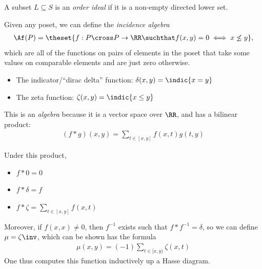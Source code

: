 \begin{definition}

A subset \(L \subseteq S\) is an \emph{order ideal} if it is a non-empty
directed lower set.

\end{definition}

\begin{definition}

Given any poset, we can define the \emph{incidence algebra}
\begin{align*}
\Af(P) = \theset{f: P \cross P \to \RR \suchthat f(x,y) = 0 \iff x \not\leq y },
\end{align*} which are all of the functions on pairs of elements in the
poset that take some values on comparable elements and are just zero
otherwise.

\end{definition}

\begin{example}

\hfill

\begin{itemize}
\tightlist
\item
  The indicator/``dirac delta'' function: \(\delta(x,y) = \indic{x=y}\)
\item
  The zeta function: \(\zeta(x,y) = \indic{x \leq y}\)
\end{itemize}

This is an \emph{algebra} because it is a vector space over \(\RR\), and
has a bilinear product:
\begin{align*}
(f \ast g)(x, y) = \sum_{t\in[x,y]}f(x,t) g(t, y)
\end{align*}

Under this product,

\begin{itemize}
\tightlist
\item
  \(f\ast 0 = 0\)
\item
  \(f\ast\delta = f\)
\item
  \(f\ast \zeta = \displaystyle\sum_{t\in[x,y]}f(x,t)\)
\end{itemize}

Moreover, if \(f(x,x) \neq 0\), then \(f^{-1}\) exists such that
\(f\ast f^{-1} = \delta\), so we can define \(\mu = \zeta\inv\), which
can be shown has the formula
\begin{align*}
\mu(x,y) = (-1)\sum_{ t \in [x,y)}\zeta(x, t)
\end{align*} One thus computes this function inductively up a Hasse
diagram.

\end{example}


